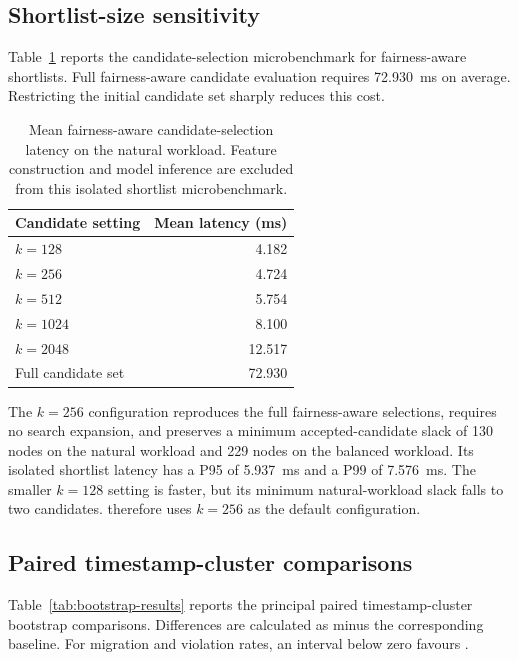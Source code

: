 \subsection{Shortlist-size sensitivity}

Table~\ref{tab:shortlist-sensitivity} reports the candidate-selection
microbenchmark for fairness-aware shortlists. Full fairness-aware
candidate evaluation requires 72.930~ms on average. Restricting the
initial candidate set sharply reduces this cost.

\begin{table}[t]
\centering
\caption{Mean fairness-aware candidate-selection latency on the natural
workload. Feature construction and model inference are excluded from
this isolated shortlist microbenchmark.}
\label{tab:shortlist-sensitivity}
\begin{tabular}{lr}
\toprule
Candidate setting & Mean latency (ms) \\
\midrule
$k=128$ & 4.182 \\
$k=256$ & 4.724 \\
$k=512$ & 5.754 \\
$k=1024$ & 8.100 \\
$k=2048$ & 12.517 \\
Full candidate set & 72.930 \\
\bottomrule
\end{tabular}
\end{table}

The $k=256$ configuration reproduces the full fairness-aware selections,
requires no search expansion, and preserves a minimum accepted-candidate
slack of 130 nodes on the natural workload and 229 nodes on the balanced
workload. Its isolated shortlist latency has a P95 of 5.937~ms and a P99
of 7.576~ms. The smaller $k=128$ setting is faster, but its minimum
natural-workload slack falls to two candidates. \cage therefore uses
$k=256$ as the default configuration.

\subsection{Paired timestamp-cluster comparisons}

Table~\ref{tab:bootstrap-results} reports the principal paired
timestamp-cluster bootstrap comparisons. Differences are calculated as
\cage minus the corresponding baseline. For migration and violation
rates, an interval below zero favours \cage.

